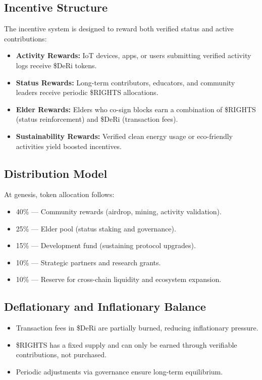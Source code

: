 \documentclass[11pt,a4paper]{article}
\begin{document}
\subsection{Incentive Structure}
The incentive system is designed to reward both verified status and active contributions:

\begin{itemize}
    \item \textbf{Activity Rewards:} IoT devices, apps, or users submitting verified activity logs receive \$DeRi tokens.
    \item \textbf{Status Rewards:} Long-term contributors, educators, and community leaders receive periodic \$RIGHTS allocations.
    \item \textbf{Elder Rewards:} Elders who co-sign blocks earn a combination of \$RIGHTS (status reinforcement) and \$DeRi (transaction fees).
    \item \textbf{Sustainability Rewards:} Verified clean energy usage or eco-friendly activities yield boosted incentives.
\end{itemize}

\subsection{Distribution Model}
At genesis, token allocation follows:

\begin{itemize}
    \item 40\% --- Community rewards (airdrop, mining, activity validation).
    \item 25\% --- Elder pool (status staking and governance).
    \item 15\% --- Development fund (sustaining protocol upgrades).
    \item 10\% --- Strategic partners and research grants.
    \item 10\% --- Reserve for cross-chain liquidity and ecosystem expansion.
\end{itemize}

\subsection{Deflationary and Inflationary Balance}
\begin{itemize}
    \item Transaction fees in \$DeRi are partially burned, reducing inflationary pressure.
    \item \$RIGHTS has a fixed supply and can only be earned through verifiable contributions, not purchased.
    \item Periodic adjustments via governance ensure long-term equilibrium.
\end{itemize}
\end{document}
